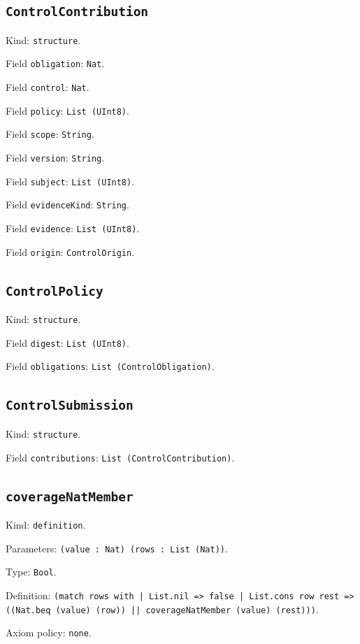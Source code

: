 \documentclass[11pt]{article}
\begin{document}
\subsection*{\texttt{ControlContribution}}
\noindent Kind: \texttt{structure}.\par
\noindent Field \texttt{obligation}: \texttt{Nat}.\par
\noindent Field \texttt{control}: \texttt{Nat}.\par
\noindent Field \texttt{policy}: \texttt{List (UInt8)}.\par
\noindent Field \texttt{scope}: \texttt{String}.\par
\noindent Field \texttt{version}: \texttt{String}.\par
\noindent Field \texttt{subject}: \texttt{List (UInt8)}.\par
\noindent Field \texttt{evidenceKind}: \texttt{String}.\par
\noindent Field \texttt{evidence}: \texttt{List (UInt8)}.\par
\noindent Field \texttt{origin}: \texttt{ControlOrigin}.\par
\subsection*{\texttt{ControlPolicy}}
\noindent Kind: \texttt{structure}.\par
\noindent Field \texttt{digest}: \texttt{List (UInt8)}.\par
\noindent Field \texttt{obligations}: \texttt{List (ControlObligation)}.\par
\subsection*{\texttt{ControlSubmission}}
\noindent Kind: \texttt{structure}.\par
\noindent Field \texttt{contributions}: \texttt{List (ControlContribution)}.\par
\subsection*{\texttt{coverageNatMember}}
\noindent Kind: \texttt{definition}.\par
\noindent Parameters: \texttt{(value : Nat) (rows : List (Nat))}.\par
\noindent Type: \texttt{Bool}.\par
\noindent Definition: \texttt{(match rows with | List.nil => false | List.cons row rest => ((Nat.beq (value) (row)) || coverageNatMember (value) (rest)))}.\par
\noindent Axiom policy: \texttt{none}.\par
\end{document}
